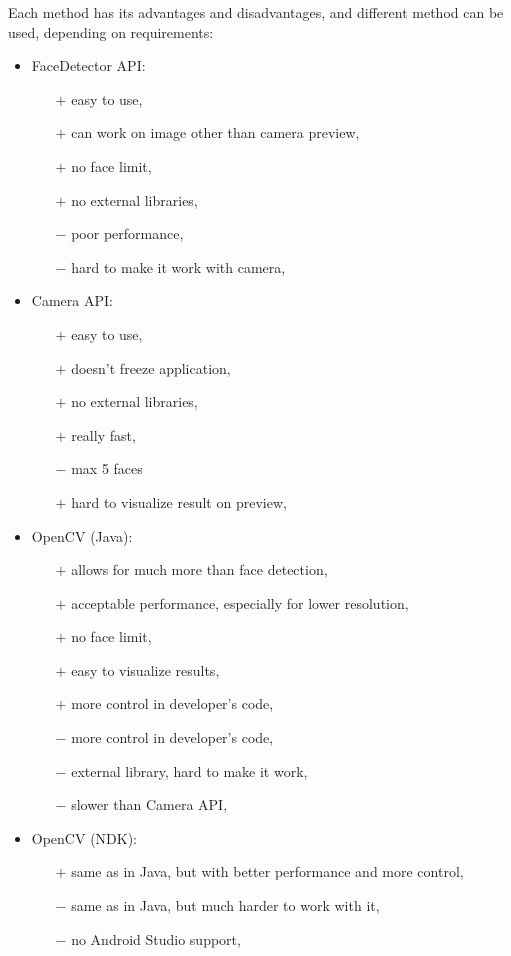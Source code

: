Each method has its advantages and disadvantages, and different method can be
used, depending on requirements:
\begin{itemize}
  \item FaceDetector API:
  	\begin{itemize}
  	  \item[$+$] easy to use,
  	  \item[$+$] can work on image other than camera preview,
  	  \item[$+$] no face limit,
  	  \item[$+$] no external libraries,
  	  \item[$-$] poor performance,
  	  \item[$-$] hard to make it work with camera,
  	\end{itemize}
  \item Camera API:
	\begin{itemize}
  	  \item[$+$] easy to use,
  	  \item[$+$] doesn't freeze application,
  	  \item[$+$] no external libraries,
  	  \item[$+$] really fast,
  	  \item[$-$] max 5 faces
  	  \item[$+$] hard to visualize result on preview,
  	\end{itemize}
  \item OpenCV (Java):
	\begin{itemize}
  	  \item[$+$] allows for much more than face detection,
  	  \item[$+$] acceptable performance, especially for lower resolution,
  	  \item[$+$] no face limit,
  	  \item[$+$] easy to visualize results,
  	  \item[$+$] more control in developer's code,
  	  \item[$-$] more control in developer's code,
  	  \item[$-$] external library, hard to make it work,
  	  \item[$-$] slower than Camera API,
  	\end{itemize}
  \item OpenCV (NDK):
	\begin{itemize}
  	  \item[$+$] same as in Java, but with better performance and more control,
  	  \item[$-$] same as in Java, but much harder to work with it,
  	  \item[$-$] no Android Studio support,
  	\end{itemize}
\end{itemize}


